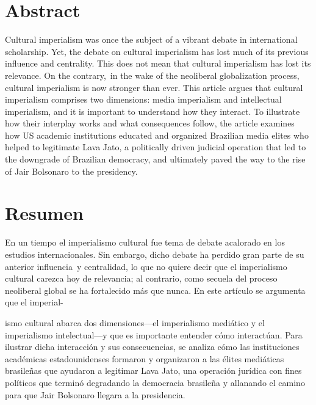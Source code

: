\documentclass{tufte-handout}
\begin{document}
\begin{titlepage}
\vspace*{1em}


\hypertarget{abstract}{%
\section{Abstract}\label{abstract}}

Cultural imperialism was once the subject of a vibrant debate in
international scholarship. Yet, the debate on cultural imperialism has
lost much of its previous influence and centrality. This does not mean
that cultural imperialism has lost its relevance. On the contrary,~in
the wake of the neoliberal globalization process, cultural imperialism
is now stronger than ever. This article argues that cultural imperialism
comprises two dimensions: media imperialism and intellectual
imperialism, and it is important to understand how they interact. To
illustrate how their interplay works and what consequences follow, the
article examines how US academic institutions educated and organized
Brazilian media elites who helped to legitimate Lava Jato, a politically
driven judicial operation that led to the downgrade of Brazilian
democracy, and ultimately paved the way to the rise of Jair Bolsonaro to
the presidency.

\hypertarget{resumen}{%
\section{Resumen}\label{resumen}}

En un tiempo el imperialismo cultural fue tema de debate acalorado en
los estudios internacionales. Sin embargo, dicho debate ha perdido gran
parte de su anterior influencia~y centralidad, lo que no quiere decir
que el imperialismo cultural carezca hoy de relevancia; al contrario,
como secuela del proceso neoliberal global se ha fortalecido más que
nunca. En este artículo se argumenta que el imperial-

\vspace*{2em}


\noindent ismo cultural abarca
dos dimensiones---el imperialismo mediático y el imperialismo
intelectual---y que es importante entender cómo interactúan. Para
ilustrar dicha interacción y sus consecuencias, se analiza cómo las
instituciones académicas estadounidenses formaron y organizaron a las
élites mediáticas brasileñas que ayudaron a legitimar Lava Jato, una
operación jurídica con fines políticos que terminó degradando la
democracia brasileña y allanando el camino para que Jair Bolsonaro
llegara a la presidencia.


\enlargethispage{2\baselineskip}

\vspace*{2em}




 \end{titlepage}
\end{document}
